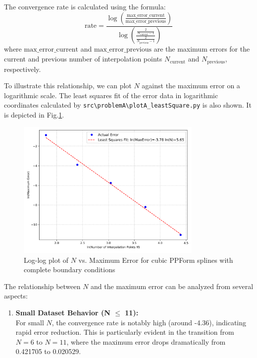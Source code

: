 \documentclass[a4paper]{article}
\begin{document}
\begin{sloppypar}
The convergence rate is calculated using the formula:
\[
  \text{rate} = \frac{\log\left(\frac{\text{max\_error\_current}}{\text{max\_error\_previous}}\right)}{\log\left(\frac{\frac{2}{N_{\text{current}} - 1}}{\frac{2}{N_{\text{previous}} - 1}}\right)}
\]
where \(\text{max\_error\_current}\) and \(\text{max\_error\_previous}\) are
the maximum errors for the current and previous number of interpolation points
\(N_{\text{current}}\) and \(N_{\text{previous}}\), respectively.

To illustrate this relationship, we can plot \(N\) against the maximum error on
a logarithmic scale. The least squares fit of the error data in logarithmic
coordinates calculated by \verb|src\problemA\plotA_leastSquare.py| is also
shown. It is depicted in Fig.\ref{fig:N_vs_maxerror}.
\begin{figure}[H]
  \centering
  \includegraphics[width=0.8\textwidth]{../figure/problemA/lnN_vs_lnMaxError.png}
  \renewcommand{\figurename}{Fig.}
  \caption{Log-log plot of \(N\) vs. Maximum Error for cubic PPForm splines with complete boundary conditions}
  \label{fig:N_vs_maxerror}
\end{figure}

The relationship between \(N\) and the maximum error can be analyzed from
several aspects:

\begin{enumerate}
  \item \textbf{Small Dataset Behavior (N $\leq$ 11):} \\
        For small \(N\), the convergence rate is notably high (around -4.36), indicating rapid error reduction. This is particularly evident in the transition from \(N=6\) to \(N=11\), where the maximum error drops dramatically from 0.421705 to 0.020529.


\end{enumerate}
\end{sloppypar}
\end{document}
